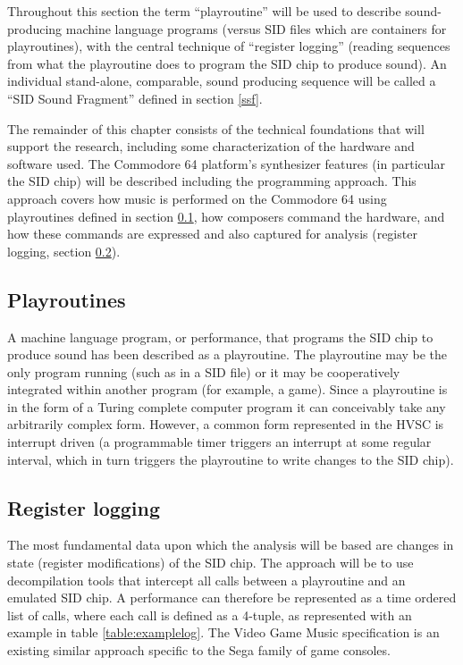 \documentclass[10pt]{article}
\begin{document}
\begin{multicols*}{2}
Throughout this section the term “playroutine” will be used to describe sound-producing machine language programs (versus SID files which are containers for playroutines), with the central technique of “register logging” (reading sequences from what the playroutine does to program the SID chip to produce sound). An individual stand-alone, comparable, sound producing sequence will be called a “SID Sound Fragment” defined in section \ref{ssf}.

The remainder of this chapter consists of the technical foundations that will support the research, including some characterization of the hardware and software used. The Commodore 64 platform’s synthesizer features (in particular the SID chip) will be described including the programming approach. This approach covers how music is performed on the Commodore 64 using playroutines defined in section \ref{playroutines}, how composers command the hardware, and how these commands are expressed and also captured for analysis (register logging, section \ref{reglog}).

\subsection{Playroutines}
\label{playroutines}

A machine language program, or performance, that programs the SID chip to produce sound has been described as a playroutine. The playroutine may be the only program running (such as in a SID file) or it may be cooperatively integrated within another program (for example, a game). Since a playroutine is in the form of a Turing complete computer program it can conceivably take any arbitrarily complex form. However, a common form represented in the HVSC is interrupt driven (a programmable timer triggers an interrupt at some regular interval, which in turn triggers the playroutine to write changes to the SID chip).

\subsection{Register logging}
\label{reglog}

The most fundamental data upon which the analysis will be based are changes in state (register modifications) of the SID chip. The approach will be to use decompilation tools that intercept all calls between a playroutine and an emulated SID chip. A performance can therefore be represented as a time ordered list of calls, where each call is defined as a 4-tuple, as represented with an example in table \ref{table:examplelog}. The Video Game Music\cite{vgmspec} specification is an existing similar approach specific to the Sega family of game consoles.


\end{multicols*}
\end{document}
